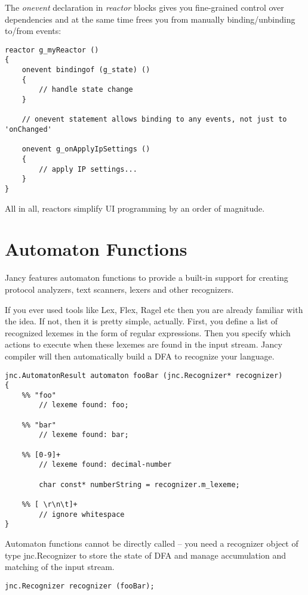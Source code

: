 \documentclass[oneside]{book}
\begin{document}
The \emph{onevent} declaration in \emph{reactor} blocks gives you fine-grained control over dependencies and at the same time frees you from manually binding/unbinding to/from events:

\begin{lstlisting}
reactor g_myReactor ()
{
    onevent bindingof (g_state) ()
    {
        // handle state change
    }

    // onevent statement allows binding to any events, not just to 'onChanged' 

    onevent g_onApplyIpSettings ()
    {
        // apply IP settings...
    }
}
\end{lstlisting}

All in all, reactors simplify UI programming by an order of magnitude.

\section{Automaton Functions}

Jancy features automaton functions to provide a built-in support for creating protocol analyzers, text scanners, lexers and other recognizers.

If you ever used tools like Lex, Flex, Ragel etc then you are already familiar with the idea. If not, then it is pretty simple, actually. First, you define a list of recognized lexemes in the form of regular expressions. Then you specify which actions to execute when these lexemes are found in the input stream. Jancy compiler will then automatically build a DFA to recognize your language.

\begin{lstlisting}
jnc.AutomatonResult automaton fooBar (jnc.Recognizer* recognizer)
{
    %% "foo"
        // lexeme found: foo;

    %% "bar"
        // lexeme found: bar;

    %% [0-9]+
        // lexeme found: decimal-number
        
        char const* numberString = recognizer.m_lexeme;

    %% [ \r\n\t]+
        // ignore whitespace
}
\end{lstlisting}

Automaton functions cannot be directly called -- you need a recognizer object of type jnc.Recognizer to store the state of DFA and manage accumulation and matching of the input stream.

\begin{lstlisting}
jnc.Recognizer recognizer (fooBar);
\end{lstlisting}
\end{document}
